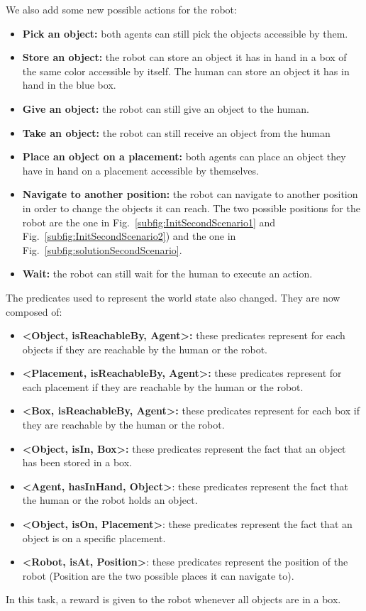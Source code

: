 \documentclass[english,a4paper,11pt,twoside]{StyleThese}
\begin{document}
We also add some new possible actions for the robot:
\begin{itemize}
\item \textbf{Pick an object:} both agents can still pick the objects accessible by them.
\item \textbf{Store an object:} the robot can store an object it has in hand in a box of the same color accessible by itself. The human can store an object it has in hand in the blue box. 
\item \textbf{Give an object:} the robot can still give an object to the human.
\item \textbf{Take an object:} the robot can still receive an object from the human
\item \textbf{Place an object on a placement:} both agents can place an object they have in hand on a placement accessible by themselves.
\item \textbf{Navigate to another position:} the robot can navigate to another position in order to change the objects it can reach. The two possible positions for the robot are the one in Fig.~\ref{subfig:InitSecondScenario1} and Fig.~\ref{subfig:InitSecondScenario2}) and the one in Fig.~\ref{subfig:solutionSecondScenario}.
\item \textbf{Wait:} the robot can still wait for the human to execute an action.
\end{itemize}
The predicates used to represent the world state also changed. They are now composed of:
\begin{itemize}
\item \textbf{<Object, isReachableBy, Agent>:} these predicates represent for each objects if they are reachable by the human or the robot.
\item \textbf{<Placement, isReachableBy, Agent>:} these predicates represent for each placement if they are reachable by the human or the robot.
\item \textbf{<Box, isReachableBy, Agent>:} these predicates represent for each box if they are reachable by the human or the robot.
\item \textbf{<Object, isIn, Box>:} these predicates represent the fact that an object has been stored in a box.
\item \textbf{<Agent, hasInHand, Object>}: these predicates represent the fact that the human or the robot holds an object.
\item \textbf{<Object, isOn, Placement>}: these predicates represent the fact that an object is on a specific placement.
\item \textbf{<Robot, isAt, Position>}: these predicates represent the position of the robot (Position are the two possible places it can navigate to).
\end{itemize}
In this task, a reward is given to the robot whenever all objects are in a box.
\end{document}
